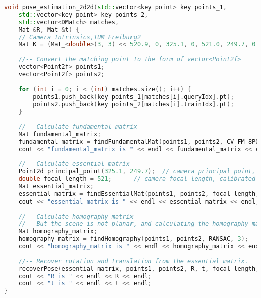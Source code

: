 \begin{lstlisting}[language=c++,caption=slambook2/ch7/pose_estimation_2d2d.cpp (part)]
void pose_estimation_2d2d(std::vector<key point> key points_1,
    std::vector<key point> key points_2,
    std::vector<DMatch> matches,
    Mat &R, Mat &t) {
    // Camera Intrinsics,TUM Freiburg2
    Mat K = (Mat_<double>(3, 3) << 520.9, 0, 325.1, 0, 521.0, 249.7, 0, 0, 1);
    
    //-- Convert the matching point to the form of vector<Point2f>
    vector<Point2f> points1;
    vector<Point2f> points2;
    
    for (int i = 0; i < (int) matches.size(); i++) {
        points1.push_back(key points_1[matches[i].queryIdx].pt);
        points2.push_back(key points_2[matches[i].trainIdx].pt);
    }
    
    //-- Calculate fundamental matrix
    Mat fundamental_matrix;
    fundamental_matrix = findFundamentalMat(points1, points2, CV_FM_8POINT);
    cout << "fundamental_matrix is " << endl << fundamental_matrix << endl;
    
    //-- Calculate essential matrix
    Point2d principal_point(325.1, 249.7);  // camera principal point, calibrated in TUM dataset
    double focal_length = 521;      // camera focal length, calibrated in TUM dataset
    Mat essential_matrix;
    essential_matrix = findEssentialMat(points1, points2, focal_length, principal_point);
    cout << "essential_matrix is " << endl << essential_matrix << endl;
    
    //-- Calculate homography matrix
    //-- But the scene is not planar, and calculating the homography matrix here is of little significance
    Mat homography_matrix;
    homography_matrix = findHomography(points1, points2, RANSAC, 3);
    cout << "homography_matrix is " << endl << homography_matrix << endl;
    
    //-- Recover rotation and translation from the essential matrix.
    recoverPose(essential_matrix, points1, points2, R, t, focal_length, principal_point);
    cout << "R is " << endl << R << endl;
    cout << "t is " << endl << t << endl;
}
\end{lstlisting}

